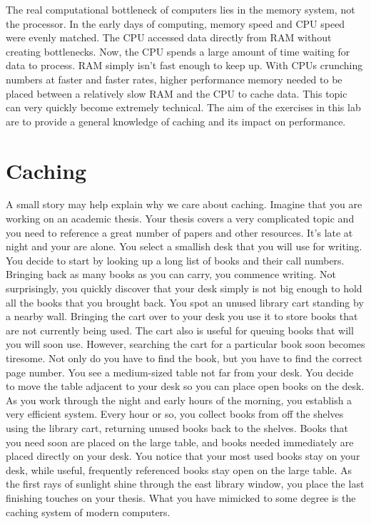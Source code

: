 
The real computational bottleneck of computers lies in the memory system, not the processor.
In the early days of computing, memory speed and CPU speed were evenly matched.
The CPU accessed data directly from RAM without creating bottlenecks.
Now, the CPU spends a large amount of time waiting for data to process.
RAM simply isn't fast enough to keep up.  With CPUs crunching numbers at faster and faster rates, higher performance memory needed to be placed between a relatively slow RAM and the CPU to cache data.
This topic can very quickly become extremely technical.
The aim of the exercises in this lab are to provide a general knowledge of caching and its impact on performance.


\section*{Caching}
A small story may help explain why we care about caching.
Imagine that you are working on an academic thesis.
Your thesis covers a very complicated topic and you need to reference a great number of papers and other resources.
It's late at night and your are alone.
You select a smallish desk that you will use for writing.
You decide to start by looking up a long list of books and their call numbers.  Bringing back as many books as you can carry, you commence writing.
Not surprisingly, you quickly discover that your desk simply is not big enough to hold all the books that you brought back.
You spot an unused library cart standing by a nearby wall.
Bringing the cart over to your desk you use it to store books that are not currently being used.
The cart also is useful for queuing books that will you will soon use.
However, searching the cart for a particular book soon becomes tiresome.
Not only do you have to find the book, but you have to find the correct page number.
You see a medium-sized table not far from your desk.
You decide to move the table adjacent to your desk so you can place open books on the desk.
As you work through the night and early hours of the morning, you establish a very efficient system.
Every hour or so, you collect books from off the shelves using the library cart, returning unused books back to the shelves.
Books that you need soon are placed on the large table, and books needed immediately are placed directly on your desk.
You notice that your most used books stay on your desk, while useful, frequently referenced books stay open on the large table.
As the first rays of sunlight shine through the east library window, you place the last finishing touches on your thesis.
What you have mimicked to some degree is the caching system of modern computers.

